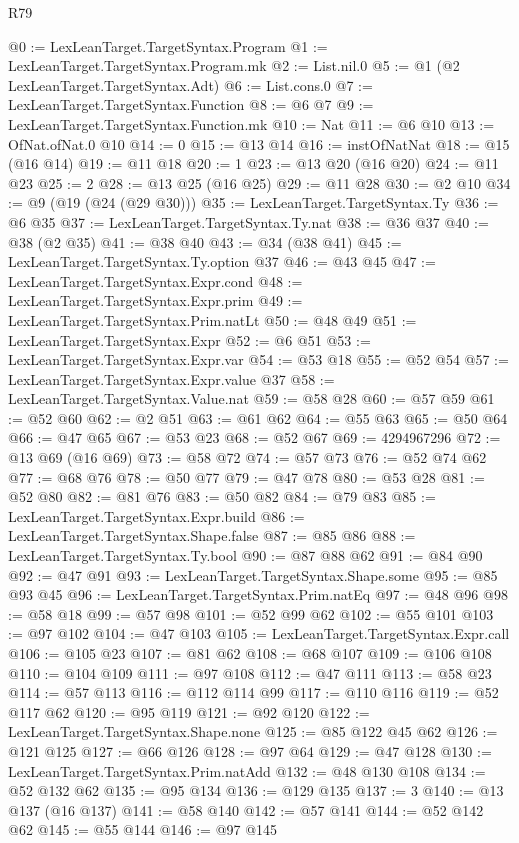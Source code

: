 \begin{lexlean}{R79}
\begin{coremodule}
@0 := LexLeanTarget.TargetSyntax.Program
@1 := LexLeanTarget.TargetSyntax.Program.mk
@2 := List.nil.{0}
@5 := @1 (@2 LexLeanTarget.TargetSyntax.Adt)
@6 := List.cons.{0}
@7 := LexLeanTarget.TargetSyntax.Function
@8 := @6 @7
@9 := LexLeanTarget.TargetSyntax.Function.mk
@10 := Nat
@11 := @6 @10
@13 := OfNat.ofNat.{0} @10
@14 := 0
@15 := @13 @14
@16 := instOfNatNat
@18 := @15 (@16 @14)
@19 := @11 @18
@20 := 1
@23 := @13 @20 (@16 @20)
@24 := @11 @23
@25 := 2
@28 := @13 @25 (@16 @25)
@29 := @11 @28
@30 := @2 @10
@34 := @9 (@19 (@24 (@29 @30)))
@35 := LexLeanTarget.TargetSyntax.Ty
@36 := @6 @35
@37 := LexLeanTarget.TargetSyntax.Ty.nat
@38 := @36 @37
@40 := @38 (@2 @35)
@41 := @38 @40
@43 := @34 (@38 @41)
@45 := LexLeanTarget.TargetSyntax.Ty.option @37
@46 := @43 @45
@47 := LexLeanTarget.TargetSyntax.Expr.cond
@48 := LexLeanTarget.TargetSyntax.Expr.prim
@49 := LexLeanTarget.TargetSyntax.Prim.natLt
@50 := @48 @49
@51 := LexLeanTarget.TargetSyntax.Expr
@52 := @6 @51
@53 := LexLeanTarget.TargetSyntax.Expr.var
@54 := @53 @18
@55 := @52 @54
@57 := LexLeanTarget.TargetSyntax.Expr.value @37
@58 := LexLeanTarget.TargetSyntax.Value.nat
@59 := @58 @28
@60 := @57 @59
@61 := @52 @60
@62 := @2 @51
@63 := @61 @62
@64 := @55 @63
@65 := @50 @64
@66 := @47 @65
@67 := @53 @23
@68 := @52 @67
@69 := 4294967296
@72 := @13 @69 (@16 @69)
@73 := @58 @72
@74 := @57 @73
@76 := @52 @74 @62
@77 := @68 @76
@78 := @50 @77
@79 := @47 @78
@80 := @53 @28
@81 := @52 @80
@82 := @81 @76
@83 := @50 @82
@84 := @79 @83
@85 := LexLeanTarget.TargetSyntax.Expr.build
@86 := LexLeanTarget.TargetSyntax.Shape.false
@87 := @85 @86
@88 := LexLeanTarget.TargetSyntax.Ty.bool
@90 := @87 @88 @62
@91 := @84 @90
@92 := @47 @91
@93 := LexLeanTarget.TargetSyntax.Shape.some
@95 := @85 @93 @45
@96 := LexLeanTarget.TargetSyntax.Prim.natEq
@97 := @48 @96
@98 := @58 @18
@99 := @57 @98
@101 := @52 @99 @62
@102 := @55 @101
@103 := @97 @102
@104 := @47 @103
@105 := LexLeanTarget.TargetSyntax.Expr.call
@106 := @105 @23
@107 := @81 @62
@108 := @68 @107
@109 := @106 @108
@110 := @104 @109
@111 := @97 @108
@112 := @47 @111
@113 := @58 @23
@114 := @57 @113
@116 := @112 @114 @99
@117 := @110 @116
@119 := @52 @117 @62
@120 := @95 @119
@121 := @92 @120
@122 := LexLeanTarget.TargetSyntax.Shape.none
@125 := @85 @122 @45 @62
@126 := @121 @125
@127 := @66 @126
@128 := @97 @64
@129 := @47 @128
@130 := LexLeanTarget.TargetSyntax.Prim.natAdd
@132 := @48 @130 @108
@134 := @52 @132 @62
@135 := @95 @134
@136 := @129 @135
@137 := 3
@140 := @13 @137 (@16 @137)
@141 := @58 @140
@142 := @57 @141
@144 := @52 @142 @62
@145 := @55 @144
@146 := @97 @145

\end{coremodule}
\end{lexlean}
